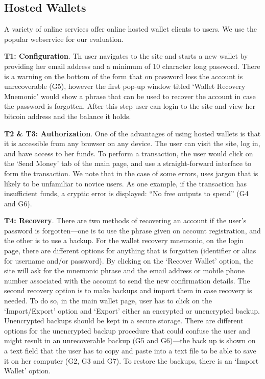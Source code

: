 \subsection{Hosted Wallets}
\label{hosted}
A variety of online services offer online hosted wallet clients to users. We use the popular \block webservice for our evaluation.

\textbf{T1: Configuration}.
Th user navigates to the \block site and starts a new wallet by providing her email address and a minimum of 10 character long password. There is a warning on the bottom of the form that on password loss the account is unrecoverable (G5), however the first pop-up window titled `Wallet Recovery Mnemonic' would show a phrase that can be used to recover the account in case the password is forgotten. After this step user can login to the site and view her bitcoin address and the balance it holds.

\textbf{T2 \& T3: Authorization}.
\label{hosted transaction}
One of the advantages of using hosted wallets is that it is accessible from any browser on any device. The user can visit the site, log in, and have access to her funds. To perform a transaction, the user would click on the `Send Money' tab of the main page, and use a straight-forward interface to form the transaction. We note that in the case of some errors, \block uses jargon that is likely to be unfamiliar to novice users. As one example, if the transaction has insufficient funds, a cryptic error is displayed: ``No free outputs to spend'' (G4 and G6).

\textbf{T4: Recovery}.
There are two methods of recovering an account if the user's password is forgotten---one is to use the phrase given on account registration, and the other is to use a backup. For the wallet recovery mnemonic, on the login page, there are different options for anything that is forgotten (identifier or alias for username and/or password). By clicking on the `Recover Wallet' option, the site will ask for the mnemonic phrase and the email address or mobile phone number associated with the account to send the new confirmation details. The second recovery option is to make backups and import them in case recovery is needed. To do so, in the main wallet page, user has to click on the `Import/Export' option and `Export' either an encrypted or unencrypted backup. Unencrypted backups should be kept in a secure storage. There are different options for the unencrypted backup procedure that could confuse the user and might result in an unrecoverable backup (G5 and G6)---the back up is shown on a text field that the user has to copy and paste into a text file to be able to save it on her computer (G2, G3 and G7). To restore the backups, there is an `Import Wallet' option.
 

